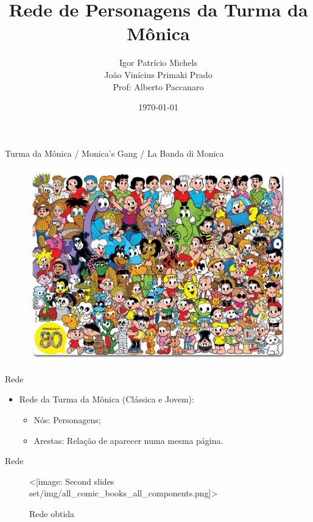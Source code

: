 \documentclass{beamer}
\title[Network Science]
{Rede de Personagens da Turma da Mônica}
\author[Igor Michels e João Primaki]
{
    Igor Patrício Michels \\
    João Vinícius Primaki Prado \\
    Prof: Alberto Paccanaro
}
\institute[FGV]
{
  Escola de Matemática Aplicada \\
  Fundação Getulio Vargas
}
\date[\today]
{\today}
\def\texttt#1{<#1>}%
\begin{document}
\begin{frame}
\titlepage
\end{frame} %

\begin{frame}{Turma da Mônica / Monica's Gang / La Banda di Monica}
\begin{figure}
    \centering
    \includegraphics[scale = 0.45]{img/tdm.jpg}
\end{figure}
\end{frame}


\begin{frame}{Rede}
\begin{itemize}
    \item Rede da Turma da Mônica (Clássica e Jovem):
    \begin{itemize}
        \vspace{12pt}
        \item Nós: Personagens;
        \vspace{12pt}
        \item Arestas: Relação de aparecer numa mesma página.
    \end{itemize}
    \vspace{24pt}
\end{itemize}
\end{frame}

\begin{frame}{Rede}
\begin{figure}
    \centering
    \texttt{[image: Second slides set/img/all\_comic\_books\_all\_components.png]}
    \caption{Rede obtida}
\end{figure}
\end{frame}
\end{document}
